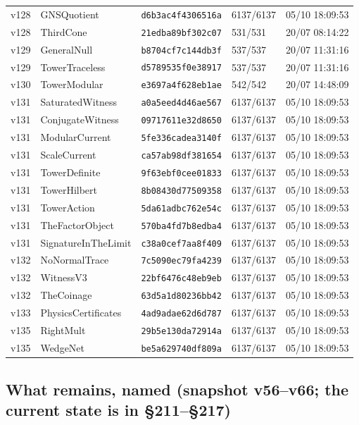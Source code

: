 \documentclass[11pt]{article}
\theoremstyle{definition}\newtheorem{deriv}{Derivation}
\begin{document}
{\begin{longtable}{@{}lllll@{}}
v128 & GNSQuotient & \texttt{d6b3ac4f4306516a} & 6137/6137 & 05/10 18:09:53 \\
v128 & ThirdCone & \texttt{21edba89bf302c07} & 531/531 & 20/07 08:14:22 \\
v129 & GeneralNull & \texttt{b8704cf7c144db3f} & 537/537 & 20/07 11:31:16 \\
v129 & TowerTraceless & \texttt{d5789535f0e38917} & 537/537 & 20/07 11:31:16 \\
v130 & TowerModular & \texttt{e3697a4f628eb1ae} & 542/542 & 20/07 14:48:09 \\
v131 & SaturatedWitness & \texttt{a0a5eed4d46ae567} & 6137/6137 & 05/10 18:09:53 \\
v131 & ConjugateWitness & \texttt{09717611e32d8650} & 6137/6137 & 05/10 18:09:53 \\
v131 & ModularCurrent & \texttt{5fe336cadea3140f} & 6137/6137 & 05/10 18:09:53 \\
v131 & ScaleCurrent & \texttt{ca57ab98df381654} & 6137/6137 & 05/10 18:09:53 \\
v131 & TowerDefinite & \texttt{9f63ebf0cee01833} & 6137/6137 & 05/10 18:09:53 \\
v131 & TowerHilbert & \texttt{8b08430d77509358} & 6137/6137 & 05/10 18:09:53 \\
v131 & TowerAction & \texttt{5da61adbc762e54c} & 6137/6137 & 05/10 18:09:53 \\
v131 & TheFactorObject & \texttt{570ba4fd7b8edba4} & 6137/6137 & 05/10 18:09:53 \\
v131 & SignatureInTheLimit & \texttt{c38a0cef7aa8f409} & 6137/6137 & 05/10 18:09:53 \\
v132 & NoNormalTrace & \texttt{7c5090ec79fa4239} & 6137/6137 & 05/10 18:09:53 \\
v132 & WitnessV3 & \texttt{22bf6476c48eb9eb} & 6137/6137 & 05/10 18:09:53 \\
v132 & TheCoinage & \texttt{63d5a1d80236bb42} & 6137/6137 & 05/10 18:09:53 \\
v133 & PhysicsCertificates & \texttt{4ad9adae62d6d787} & 6137/6137 & 05/10 18:09:53 \\
v135 & RightMult & \texttt{29b5e130da72914a} & 6137/6137 & 05/10 18:09:53 \\
v135 & WedgeNet & \texttt{be5a629740df809a} & 6137/6137 & 05/10 18:09:53 \\
\bottomrule\end{longtable}}

\subsection*{What remains, named (snapshot v56--v66; the current state is in \S211--\S217)}
\end{document}
